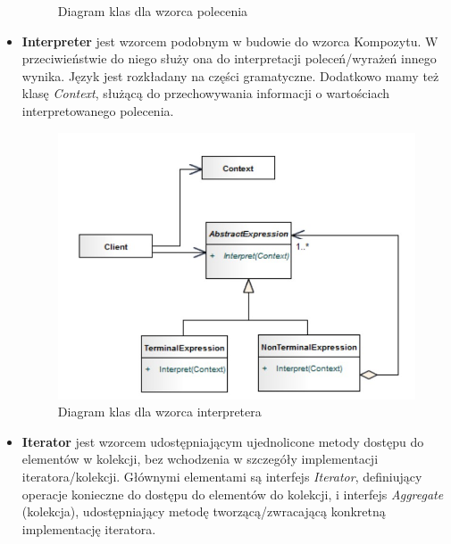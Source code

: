 \documentclass[a4paper,12pt,oneside]{book}
\begin{document}
\begin{itemize}
\begin{figure}[h]
                        \caption{Diagram klas dla wzorca polecenia}
                        \label{fig:twojastara10}
                    \end{figure}
                    \item \textbf{Interpreter} jest wzorcem podobnym w budowie do wzorca Kompozytu. W przeciwieństwie do niego służy ona do interpretacji poleceń/wyrażeń innego wynika. Język jest rozkładany na części gramatyczne. Dodatkowo mamy też klasę \textit{Context}, służącą do przechowywania informacji o wartościach interpretowanego polecenia.
                    \begin{figure}[h]
                        \centering
                        \includegraphics[width=\textwidth/2]{images/interpreter.jpg}
                        \caption{Diagram klas dla wzorca interpretera}
                        \label{fig:twojastara11}
                    \end{figure}
                    \item \textbf{Iterator} jest wzorcem udostępniającym ujednolicone metody dostępu do elementów w kolekcji, bez wchodzenia w szczegóły implementacji iteratora/kolekcji. Głównymi elementami są interfejs \textit{Iterator}, definiujący operacje konieczne do dostępu do elementów do kolekcji, i interfejs \textit{Aggregate} (kolekcja), udostępniający metodę tworzącą/zwracającą konkretną implementację iteratora.
                    \begin{figure}[h]
                        \centering

\end{figure}
\end{itemize}
\end{document}
